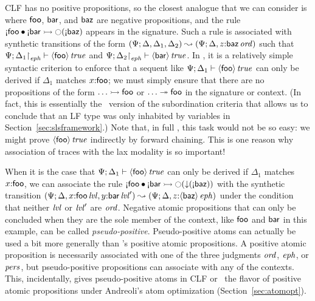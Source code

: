 CLF has no positive propositions, so the closest analogue that we can
consider is where ${\sf foo}$, ${\sf bar}$, and ${\sf baz}$ are
negative propositions, and the rule ${\gnab}{\sf foo} \fuse
{\gnab}{\sf bar} \lefti \ocircle({\gnab}{\sf baz})$ appears in the
signature. Such a rule is associated with synthetic transitions of the
form
%
$(\Psi; {\Delta},{{\Delta_1},{\Delta_2}}) \leadsto
(\Psi; {\Delta},{z{:}{{\sf baz}}\,{{\it ord}}})$ such that
${\Psi};{{\Delta_1}{\upharpoonright}_{{\it eph}}} \vdash {{\langle {\sf foo} \rangle}\,{{\it true}}} \mathstrut$
and ${\Psi};{{\Delta_2}{\upharpoonright}_{{\it eph}}} \vdash {{\langle {\sf
      bar} \rangle}\,{{\it true}}} \mathstrut$. In \sls, it is a relatively simple syntactic criterion
to enforce that a sequent like ${\Psi};{\Delta_1} \vdash {{\langle {\sf
      foo} \rangle}\,{{\it true}}} \mathstrut$ can only be derived if $\Delta_1$ matches
$x{:}\sf{foo}$; we must simply ensure that there are no propositions
of the form $\ldots \rightarrowtail {\sf foo}$ or $\ldots \twoheadrightarrow {\sf foo}$ in
the signature or context. (In fact, this is essentially the
\sls~version of the subordination criteria that allows us to conclude
that an LF type was only inhabited by variables in 
Section~\ref{sec:slsframework}.)  Note that, in full \ollll, this task
would not be so easy: we might prove ${\langle {\sf foo} \rangle}\,{{\it true}}$
indirectly by forward chaining. This is one reason why association of
traces with the lax modality is so important!

When it is the case that  ${\Psi};{\Delta_1} \vdash {{\langle {\sf
      foo} \rangle}\,{{\it true}}} \mathstrut$ can only be derived if $\Delta_1$ matches
$x{:}\sf{foo}$, we can
associate the rule ${\gnab}{\sf foo} \fuse
{\gnab}{\sf bar} \lefti \ocircle({\downarrow}({\gnab}{\sf baz}))$
with the synthetic transition $(\Psi;
{\Delta},{{x{:}{{\sf foo}\,{{\it lvl}}}},{y{:}{{\sf
        bar}\,{{\it lvl}}'}}}) \leadsto (\Psi; {\Delta},{z{:}{\langle {\sf
      baz} \rangle}\,{{\it eph}}})$ under the condition that neither ${\it lvl}$ or ${\it lvl}'$
are ${\it ord}$.
Negative atomic propositions that can only be concluded when they are
the sole member of the context, like ${\sf foo}$ and ${\sf bar}$ in
this example, can be called {\it
  pseudo-positive}. Pseudo-positive atoms can actually be used a bit
more generally than \sls's positive atomic propositions. A positive
atomic proposition is necessarily associated with one of the three
judgments ${\it ord}$, ${\it eph}$, or ${\it pers}$, but pseudo-positive
propositions can associate with any of the contexts. This,
incidentally, gives pseudo-positive atoms in CLF or \sls~the flavor of
positive atomic propositions under Andreoli's atom optimization
(Section~\ref{sec:atomopt}).

